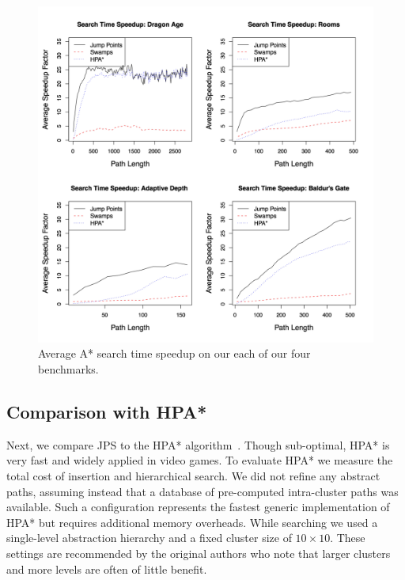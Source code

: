\begin{figure}[t!]
   \begin{center}
	   \includegraphics[width=0.98\columnwidth]
		{chapter_jps/diagrams/speedup.pdf}
   \end{center}
   \caption{Average A* search time speedup on our each of our four benchmarks. }

\label{fig::jps::speedup}
\end{figure}


\subsection{Comparison with HPA*}
Next, we compare JPS to the HPA* algorithm~\citep{botea04}.  Though
sub-optimal, HPA* is very fast and widely applied in video games.  To evaluate
HPA* we measure the total cost of insertion and hierarchical search. We did
not refine any abstract paths, assuming instead that a database of
pre-computed intra-cluster paths was available. Such a configuration
represents the fastest generic implementation of HPA* but requires additional
memory overheads.  While searching we used a single-level abstraction
hierarchy and a fixed cluster size of $10\times10$.  These settings are
recommended by the original authors who note that larger clusters and more
levels are often of little benefit.

